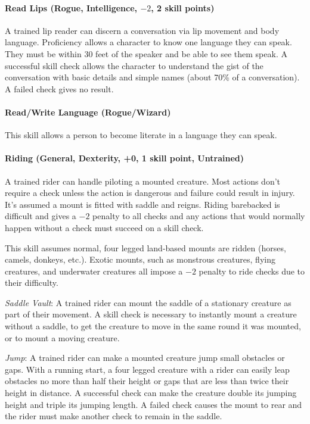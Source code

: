 \begin{multicols}{2}

\paragraph{Read Lips (Rogue, Intelligence, $-2$, 2 skill points)}

A trained lip reader can discern a conversation via lip movement and body language.  Proficiency allows a character to know one language they can speak.  They must be within 30 feet of the speaker and be able to see them speak.  A successful skill check allows the character to understand the gist of the conversation with basic details and simple names (about 70\% of a conversation).  A failed check gives no result.

\paragraph{Read/Write Language (Rogue/Wizard)}

This skill allows a person to become literate in a language they can speak.  

\paragraph{Riding (General, Dexterity, +0, 1 skill point, Untrained)}
A trained rider can handle piloting a mounted creature.  Most actions don't require a check unless the action is dangerous and failure could result in injury.  It's assumed a mount is fitted with saddle and reigns.  Riding barebacked is difficult and gives a $-2$ penalty to all checks and any actions that would normally happen without a check must succeed on a skill check.

This skill assumes normal, four legged land-based mounts are ridden (horses, camels, donkeys, etc.).  Exotic mounts, such as monstrous creatures, flying creatures, and underwater creatures all impose a $-2$ penalty to ride checks due to their difficulty.

\textit{Saddle Vault}: A trained rider can mount the saddle of a stationary creature as part of their movement.  A skill check is necessary to instantly mount a creature without a saddle, to get the creature to move in the same round it was mounted, or to mount a moving creature.

\textit{Jump}: A trained rider can make a mounted creature jump small obstacles or gaps.  With a running start, a four legged creature with a rider can easily leap obstacles no more than half their height or gaps that are less than twice their height in distance.  A successful check can make the creature double its jumping height and triple its jumping length.  A failed check causes the mount to rear and the rider must make another check to remain in the saddle.


\end{multicols}
